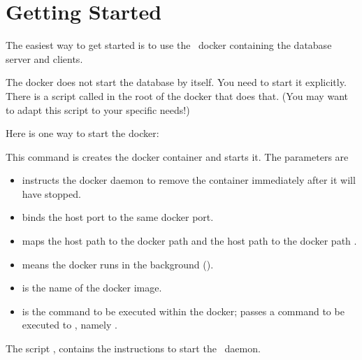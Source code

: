 \section{Getting Started}

The easiest way to get started
is to use the \nowdb\ docker containing
the database server and clients.


The docker does not start the database by itself.
You need to start it explicitly. There is a script
called  in the root of the docker
that does that.
(You may want to adapt this script to your specific needs!)

Here is one way to start the docker:


This command is creates the docker container and starts it.
The parameters are
\begin{itemize}
\item {}
instructs the docker daemon to remove
the container immediately after it will have stopped.

\item {} binds the host port 
to the same docker port.

\item {} maps the host path
 to the docker path  and
the host path  to the docker path .

\item {} means the docker runs in the background
().

\item {} is the name of the docker image.

\item {} is the command to be executed
within the docker;  passes a command
to be executed to ,
namely .
\end{itemize}

The script , contains the
instructions to start the \nowdb\ daemon.

